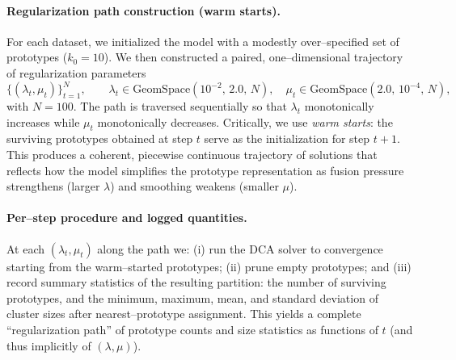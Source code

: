 \documentclass[11pt]{article}
\theoremstyle{definition}
\newcommand{\1}{\mathbf{1}}
\begin{document}
\paragraph{Regularization path construction (warm starts).}
For each dataset, we initialized the model with a modestly over--specified set
of prototypes ($k_0 = 10$). We then constructed a paired, one--dimensional
trajectory of regularization parameters
\[
\bigl\{(\lambda_t,\mu_t)\bigr\}_{t=1}^{N},\qquad
\lambda_t \in \mathrm{GeomSpace}\!\left(10^{-2},\,2.0,\,N\right),\quad
\mu_t \in \mathrm{GeomSpace}\!\left(2.0,\,10^{-4},\,N\right),
\]
with $N=100$. The path is traversed sequentially so that $\lambda_t$
monotonically increases while $\mu_t$ monotonically decreases. Critically, we
use \emph{warm starts}: the surviving prototypes obtained at step $t$ serve as
the initialization for step $t{+}1$. This produces a coherent, piecewise
continuous trajectory of solutions that reflects how the model simplifies the
prototype representation as fusion pressure strengthens (larger $\lambda$) and
smoothing weakens (smaller $\mu$).

\paragraph{Per--step procedure and logged quantities.}
At each $(\lambda_t,\mu_t)$ along the path we:
(i) run the DCA solver to convergence starting from the warm--started
prototypes; (ii) prune empty prototypes; and (iii) record
summary statistics of the resulting partition: the number of surviving
prototypes, and the minimum, maximum, mean, and standard deviation of cluster
sizes after nearest--prototype assignment. This yields a complete ``regularization
path'' of prototype counts and size statistics as functions of $t$ (and thus
implicitly of $(\lambda,\mu)$).
\end{document}
